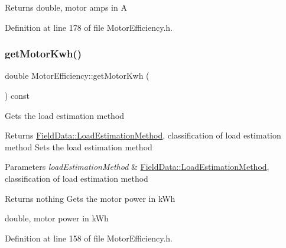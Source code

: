 \begin{DoxyReturn}{Returns}
double, motor amps in A 
\end{DoxyReturn}


Definition at line 178 of file Motor\+Efficiency.\+h.

\mbox{\label{class_motor_efficiency_a4d21d0c44ee00f5d097b0acbcb73a8d8}} 
\subsubsection{\texorpdfstring{get\+Motor\+Kwh()}{getMotorKwh()}\hspace{0.1cm}{\footnotesize\ttfamily [1/3]}}
{\footnotesize\ttfamily double Motor\+Efficiency\+::get\+Motor\+Kwh (\begin{DoxyParamCaption}{ }\end{DoxyParamCaption}) const\hspace{0.3cm}{\ttfamily [inline]}}

Gets the load estimation method

\begin{DoxyReturn}{Returns}
\hyperlink{class_field_data_a424e89914ba5684c01bb269dbe3312fd}{Field\+Data\+::\+Load\+Estimation\+Method}, classification of load estimation method Sets the load estimation method
\end{DoxyReturn}

\begin{DoxyParams}{Parameters}
{\em load\+Estimation\+Method} & \hyperlink{class_field_data_a424e89914ba5684c01bb269dbe3312fd}{Field\+Data\+::\+Load\+Estimation\+Method}, classification of load estimation method\\
\hline
\end{DoxyParams}
\begin{DoxyReturn}{Returns}
nothing Gets the motor power in k\+Wh

double, motor power in k\+Wh 
\end{DoxyReturn}


Definition at line 158 of file Motor\+Efficiency.\+h.

\mbox{\label{class_motor_efficiency_a4d21d0c44ee00f5d097b0acbcb73a8d8}} 
